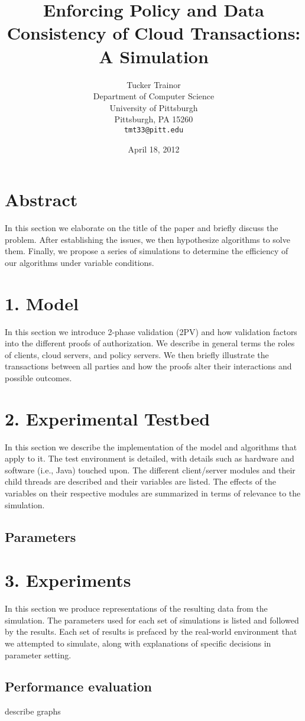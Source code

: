 \documentclass[11pt]{article}
\title{Enforcing Policy and Data Consistency of Cloud Transactions: A Simulation}
\author{Tucker Trainor\\Department of Computer Science\\University of Pittsburgh\\Pittsburgh, PA 15260\\\texttt{tmt33@pitt.edu}}
\date{April 18, 2012} %
\begin{document}
\maketitle
\section{Abstract}
In this section we elaborate on the title of the paper and briefly discuss the problem. After establishing the issues, we then hypothesize algorithms to solve them. Finally, we propose a series of simulations to determine the efficiency of our algorithms under variable conditions.
\section{1. Model}
In this section we introduce 2-phase validation (2PV) \cite{Iskander} and how validation factors into the different proofs of authorization. We describe in general terms the roles of clients, cloud servers, and policy servers. We then briefly illustrate the transactions between all parties and how the proofs alter their interactions and possible outcomes.
\section{2. Experimental Testbed}
In this section we describe the implementation of the model and algorithms that apply to it. The test environment is detailed, with details such as hardware and software (i.e., Java) touched upon. The different client/server modules and their child threads are described and their variables are listed. The effects of the variables on their respective modules are summarized in terms of relevance to the simulation.
\subsection{Parameters}
\section{3. Experiments}
In this section we produce representations of the resulting data from the simulation. The parameters used for each set of simulations is listed and followed by the results. Each set of results is prefaced by the real-world environment that we attempted to simulate, along with explanations of specific decisions in parameter setting.
\subsection{Performance evaluation}
describe graphs
\end{document}
